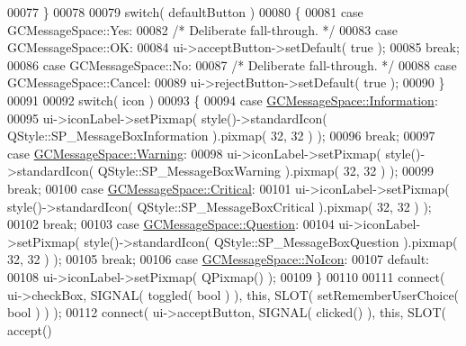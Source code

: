 \begin{DoxyCode}
00077     \}
00078 
00079     \textcolor{keywordflow}{switch}( defaultButton )
00080     \{
00081     \textcolor{keywordflow}{case} GCMessageSpace::Yes:
00082       \textcolor{comment}{/* Deliberate fall-through. */}
00083     \textcolor{keywordflow}{case} GCMessageSpace::OK:
00084       ui->acceptButton->setDefault( \textcolor{keyword}{true} );
00085       \textcolor{keywordflow}{break};
00086     \textcolor{keywordflow}{case} GCMessageSpace::No:
00087       \textcolor{comment}{/* Deliberate fall-through. */}
00088     \textcolor{keywordflow}{case} GCMessageSpace::Cancel:
00089       ui->rejectButton->setDefault( \textcolor{keyword}{true} );
00090     \}
00091 
00092     \textcolor{keywordflow}{switch}( icon )
00093     \{
00094     \textcolor{keywordflow}{case} \hyperlink{namespace_g_c_message_space_a67e94586e09cbc305257fbcdd7b686e2aa675bd9dc6c7b7735b0c1c20954b8323}{GCMessageSpace::Information}:
00095       ui->iconLabel->setPixmap( style()->standardIcon( 
      QStyle::SP\_MessageBoxInformation ).pixmap( 32, 32 ) );
00096       \textcolor{keywordflow}{break};
00097     \textcolor{keywordflow}{case} \hyperlink{namespace_g_c_message_space_a67e94586e09cbc305257fbcdd7b686e2ab454bae3ed7cef63f273c303aea6c4c3}{GCMessageSpace::Warning}:
00098       ui->iconLabel->setPixmap( style()->standardIcon( 
      QStyle::SP\_MessageBoxWarning ).pixmap( 32, 32 ) );
00099       \textcolor{keywordflow}{break};
00100     \textcolor{keywordflow}{case} \hyperlink{namespace_g_c_message_space_a67e94586e09cbc305257fbcdd7b686e2a4e02f76ed3971c8adbee5dd44724e8a6}{GCMessageSpace::Critical}:
00101       ui->iconLabel->setPixmap( style()->standardIcon( 
      QStyle::SP\_MessageBoxCritical ).pixmap( 32, 32 ) );
00102       \textcolor{keywordflow}{break};
00103     \textcolor{keywordflow}{case} \hyperlink{namespace_g_c_message_space_a67e94586e09cbc305257fbcdd7b686e2ae66d6709c87ccb0832b1456e2b4ad895}{GCMessageSpace::Question}:
00104       ui->iconLabel->setPixmap( style()->standardIcon( 
      QStyle::SP\_MessageBoxQuestion ).pixmap( 32, 32 ) );
00105       \textcolor{keywordflow}{break};
00106     \textcolor{keywordflow}{case} \hyperlink{namespace_g_c_message_space_a67e94586e09cbc305257fbcdd7b686e2a54bba077357d6db019fb791266e133f0}{GCMessageSpace::NoIcon}:
00107     \textcolor{keywordflow}{default}:
00108       ui->iconLabel->setPixmap( QPixmap() );
00109     \}
00110 
00111     connect( ui->checkBox,     SIGNAL( toggled( \textcolor{keywordtype}{bool} ) ), \textcolor{keyword}{this}, SLOT( 
      setRememberUserChoice( \textcolor{keywordtype}{bool} ) ) );
00112     connect( ui->acceptButton, SIGNAL( clicked() ),       \textcolor{keyword}{this}, SLOT( accept() 

\end{DoxyCode}
